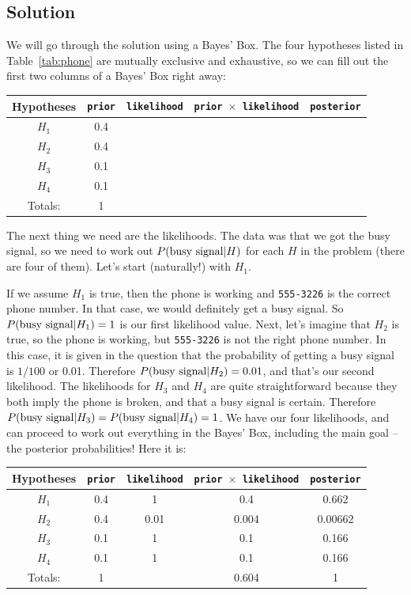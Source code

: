 \subsection{Solution}
We will go through the solution using a Bayes' Box. The four hypotheses listed
in Table~\ref{tab:phone} are mutually exclusive and exhaustive, so we can fill
out the first two columns of a Bayes' Box right away:
\begin{table}[h!]
\begin{center}
\begin{tabular}{|c|c|c|c|c|}
\hline
{\bf Hypotheses} & {\tt prior} & {\tt likelihood} &
{\tt prior $\times$ likelihood} & {\tt posterior}\\
\hline
$H_1$ & 0.4 &  &  & \\
$H_2$ & 0.4 &  &  & \\
$H_3$ & 0.1 &  &  & \\
$H_4$ & 0.1 &  &  & \\
\hline
Totals: & 1 & & & \\
\hline
\end{tabular}
\end{center}
\end{table}
The next thing we need are the likelihoods. The data was that we got the busy
signal, so we need to work out $P(\textnormal{busy signal} | H)$ for each $H$
in the problem (there are four of them). Let's start (naturally!) with $H_1$.

If we assume $H_1$ is true, then the phone is working and {\tt 555-3226} is the
correct phone number. In that case, we would definitely get a busy signal. So
$P(\textnormal{busy signal} | H_1) = 1$ is our first likelihood value.
Next, let's imagine that $H_2$ is true, so the phone is working, but
{\tt 555-3226} is not the right phone number. In this case, it is given in the
question that the probability of getting a busy signal is $1/100$ or 0.01.
Therefore $P(\textnormal{busy signal} | H_2) = 0.01$, and that's our second
likelihood. The likelihoods for $H_3$ and $H_4$ are quite straightforward
because they both imply the phone is broken, and that a busy signal is certain.
Therefore $P(\textnormal{busy signal} | H_3) = P(\textnormal{busy signal} | H_4) = 1$.
We have our four likelihoods, and can proceed to work out everything in the
Bayes' Box, including the main goal -- the posterior probabilities! Here it is:
\begin{table}[h!]
\begin{center}
\begin{tabular}{|c|c|c|c|c|}
\hline
{\bf Hypotheses} & {\tt prior} & {\tt likelihood} &
{\tt prior $\times$ likelihood} & {\tt posterior}\\
\hline
$H_1$ & 0.4 & 1 &  0.4 & 0.662\\
$H_2$ & 0.4 & 0.01 & 0.004 & 0.00662\\
$H_3$ & 0.1 & 1 & 0.1 & 0.166\\
$H_4$ & 0.1 & 1 & 0.1 & 0.166\\
\hline
Totals: & 1 & & 0.604 & 1\\
\hline
\end{tabular}
\end{center}
\end{table}

